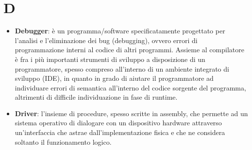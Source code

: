 \section{D}
\begin{itemize} 
	\item
	\textbf{Debugger}: è un programma/software specificatamente progettato per l'analisi e l'eliminazione dei bug (debugging), ovvero errori di programmazione interni al codice di altri programmi. Assieme al compilatore è fra i più importanti strumenti di sviluppo a disposizione di un programmatore, spesso compreso all'interno di un ambiente integrato di sviluppo (IDE), in quanto in grado di aiutare il programmatore ad individuare errori di semantica all'interno del codice sorgente del programma, altrimenti di difficile individuazione in fase di runtime.
	\item
	\textbf{Driver}: l'insieme di procedure, spesso scritte in assembly, che permette ad un sistema operativo di dialogare con un dispositivo hardware attraverso un'interfaccia che astrae dall'implementazione fisica e che ne considera soltanto il funzionamento logico. 
\end{itemize}
